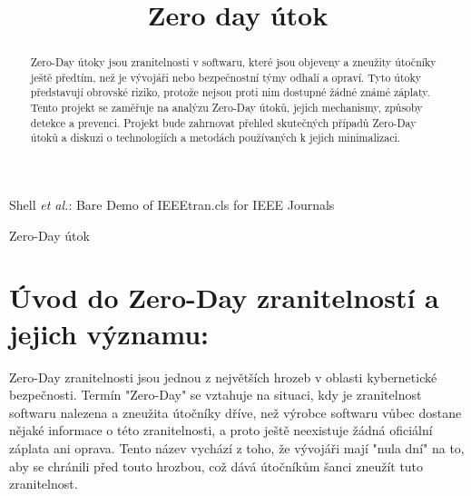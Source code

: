 \documentclass[11pt, conference, a4paper]{IEEEtran}
\begin{document}
\title{Zero day \' utok}


\author{
}



%
{Shell \MakeLowercase{\textit{et al.}}: Bare Demo of IEEEtran.cls for IEEE Journals}



\maketitle

\begin{abstract}
Zero-Day útoky jsou zranitelnosti v softwaru, které jsou objeveny a zneužity útočníky ještě předtím, než je vývojáři nebo bezpečnostní týmy odhalí a opraví. Tyto útoky představují obrovské riziko, protože nejsou proti nim dostupné žádné známé záplaty. Tento projekt se zaměřuje na analýzu Zero-Day útoků, jejich mechanismy, způsoby detekce a prevenci. Projekt bude zahrnovat přehled skutečných případů Zero-Day útoků a diskuzi o technologiích a metodách používaných k jejich minimalizaci.
\end{abstract}

\begin{IEEEkeywords}
Zero-Day útok
\end{IEEEkeywords}


\IEEEpeerreviewmaketitle



\section{Úvod do Zero-Day zranitelností a jejich významu:}
Zero-Day zranitelnosti jsou jednou z největších hrozeb v oblasti kybernetické bezpečnosti. Termín "Zero-Day" se vztahuje na situaci, kdy je zranitelnost softwaru nalezena a zneužita útočníky dříve, než výrobce softwaru v\r ubec dostane nějaké informace o této zranitelnosti, a proto ještě neexistuje žádná oficiální záplata ani oprava. Tento název vychází z toho, že vývojáři mají "nula dní" na to, aby se chránili před touto hrozbou, což dává útočníkům šanci zneužít tuto zranitelnost.
\end{document}
